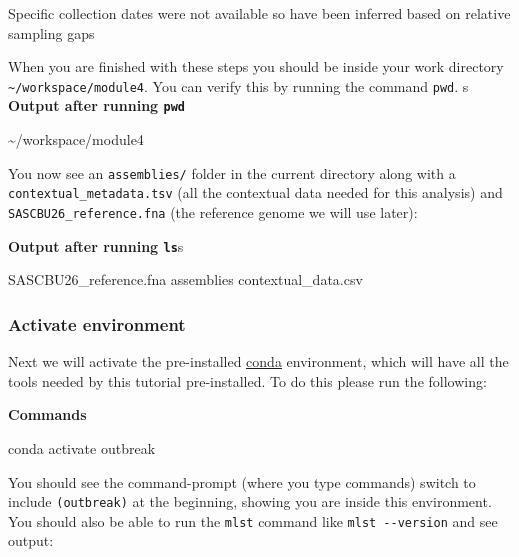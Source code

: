 \documentclass[
]{book}
\newenvironment{Shaded}{\begin{snugshade}}{\end{snugshade}}
\newcommand{\ExtensionTok}[1]{#1}
\newcommand{\NormalTok}[1]{#1}
\begin{document}
Specific collection dates were not available so have been inferred based on relative sampling gaps

When you are finished with these steps you should be inside your work directory \texttt{\textasciitilde{}/workspace/module4}. You can verify this by running the command \texttt{pwd}.
s
\textbf{Output after running \texttt{pwd}}

\begin{Shaded}
\begin{Highlighting}[]
\ExtensionTok{\textasciitilde{}/workspace/module4}
\end{Highlighting}
\end{Shaded}

You now see an \texttt{assemblies/} folder in the current directory along with a \texttt{contextual\_metadata.tsv} (all the contextual data needed for this analysis) and \texttt{SASCBU26\_reference.fna} (the reference genome we will use later):

\textbf{Output after running \texttt{ls}}s

\begin{Shaded}
\begin{Highlighting}[]
\ExtensionTok{SASCBU26\_reference.fna}\NormalTok{  assemblies  contextual\_data.csv}
\end{Highlighting}
\end{Shaded}

\subsubsection{Activate environment}\label{activate-environment-1}

Next we will activate the pre-installed \href{https://docs.conda.io/en/latest/}{conda} environment, which will have all the tools needed by this tutorial pre-installed. To do this please run the following:

\textbf{Commands}

\begin{Shaded}
\begin{Highlighting}[]
\ExtensionTok{conda}\NormalTok{ activate outbreak}
\end{Highlighting}
\end{Shaded}

You should see the command-prompt (where you type commands) switch to include \texttt{(outbreak)} at the beginning, showing you are inside this environment. You should also be able to run the \texttt{mlst} command like \texttt{mlst\ -\/-version} and see output:
\end{document}
